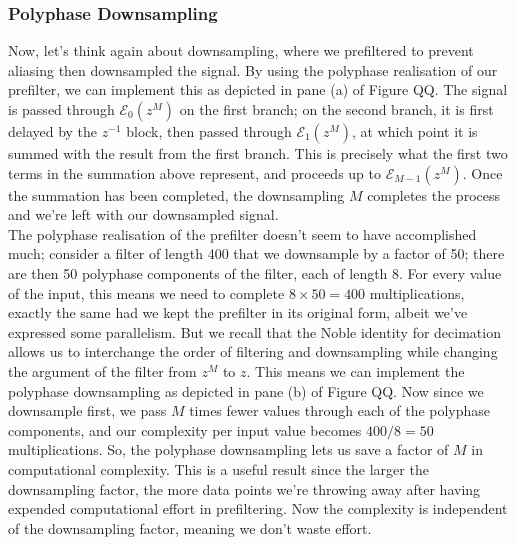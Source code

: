 \subsubsection{Polyphase Downsampling}
%
Now, let's think again about downsampling, where we prefiltered to prevent aliasing
then downsampled the signal. By using the polyphase realisation of our prefilter,
we can implement this as depicted in pane (a) of Figure QQ. The signal is passed
through $\mathscr{E}_0\left(z^M\right)$ on the first branch; on the second branch, it
is first delayed by the $z^{-1}$ block, then passed through $\mathscr{E}_1\left(z^M\right)$,
at which point it is summed with the result from the first branch. This is precisely
what the first two terms in the summation above represent, and proceeds up to
$\mathscr{E}_{M-1}\left(z^M\right)$. Once the summation has been completed, the
downsampling $M$ completes the process and we're left with our downsampled signal.\\
%
The polyphase realisation of the prefilter doesn't seem to have accomplished much;
consider a filter of length 400 that we downsample by a factor of 50; there are
then 50 polyphase components of the filter, each of length 8. For every value of the
input, this means we need to complete $8\times 50 = 400$ multiplications, exactly
the same had we kept the prefilter in its original form, albeit we've expressed
some parallelism. But we recall that the Noble identity for decimation allows
us to interchange the order of filtering and downsampling while changing the argument
of the filter from $z^M$ to $z$. This means we can implement the polyphase downsampling
as depicted in pane (b) of Figure QQ. Now since we downsample first, we pass $M$
times fewer values through each of the polyphase components, and our complexity
per input value becomes $400 / 8 = 50$ multiplications. So, the polyphase
downsampling lets us save a factor of $M$ in computational complexity. This is
a useful result since the larger the downsampling factor, the more data points
we're throwing away after having expended computational effort in prefiltering.
Now the complexity is independent of the downsampling factor, meaning we
don't waste effort.
